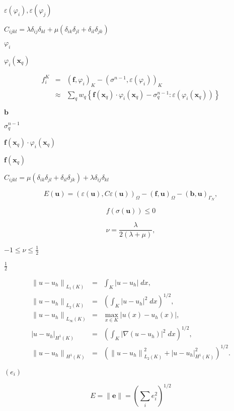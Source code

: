 \documentclass{article}
\begin{document}
$\varepsilon(\varphi_i),\varepsilon(\varphi_j)$
\pagebreak

$C_{ijkl} = \lambda \delta_{ij} \delta_{kl} + \mu (\delta_{ik} \delta_{jl} + \delta_{il} \delta_{jk})$
\pagebreak

$\varphi_i$
\pagebreak

$\varphi_i(\mathbf{x}_q)$
\pagebreak

\begin{eqnarray*} f^K_i &=& (\mathbf{f}, \varphi_i)_K -(\sigma^{n-1},\varepsilon(\varphi_i))_K \\ &\approx& \sum_q w_q \left\{ \mathbf{f}(\mathbf{x}_q) \cdot \varphi_i(\mathbf{x}_q) - \sigma^{n-1}_q : \varepsilon(\varphi_i(\mathbf{x}_q)) \right\} \end{eqnarray*}
\pagebreak

$\mathbf{b}$
\pagebreak

$\sigma^{n-1}_q$
\pagebreak

$\mathbf{f}(\mathbf{x}_q) \cdot \varphi_i(\mathbf{x}_q)$
\pagebreak

$\mathbf{f}(\mathbf{x}_q)$
\pagebreak

$C_{ijkl} = \mu (\delta_{ik} \delta_{jl} + \delta_{il} \delta_{jk}) + \lambda \delta_{ij} \delta_{kl}$
\pagebreak

\[ E(\mathbf{u}) = (\varepsilon(\mathbf{u}), C\varepsilon(\mathbf{u}))_{\Omega} - (\mathbf{f}, \mathbf{u})_{\Omega} - (\mathbf{b}, \mathbf{u})_{\Gamma_N}, \]
\pagebreak

\[ f(\sigma(\mathbf{u})) \le 0 \]
\pagebreak

\[ \nu = \frac{\lambda}{2(\lambda+\mu)}, \]
\pagebreak

$-1\le \nu\le \frac 12$
\pagebreak

$\frac 12$
\pagebreak

\begin{eqnarray*} {\| u-u_h \|}_{L_1(K)} &=& \int_K |u-u_h| \; dx, \\ {\| u-u_h \|}_{L_2(K)} &=& \left( \int_K |u-u_h|^2 \; dx \right)^{1/2}, \\ {\| u-u_h \|}_{L_\infty(K)} &=& \max_{x \in K} |u(x) - u_h(x)|, \\ {| u-u_h |}_{H^1(K)} &=& \left( \int_K |\nabla(u-u_h)|^2 \; dx \right)^{1/2}, \\ {\| u-u_h \|}_{H^1(K)} &=& \left( {\| u-u_h \|}^2_{L_2(K)} +{| u-u_h |}^2_{H^1(K)} \right)^{1/2}. \end{eqnarray*}
\pagebreak

$(e_i)$
\pagebreak

\[ E = \| {\mathbf e} \| = \left( \sum_i e_i^2 \right)^{1/2} \]
\pagebreak
\end{document}
